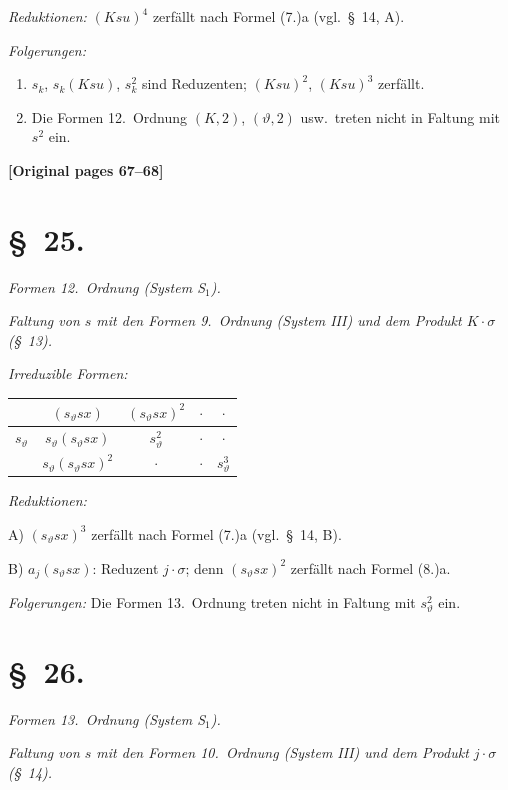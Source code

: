 \documentclass[12pt,a4paper]{article}
\begin{document}
\textit{Reduktionen:} $(Ksu)^4$ zerfällt nach Formel (7.)a (vgl.\ \S\ 14, A).

\textit{Folgerungen:}
\begin{enumerate}
\item[1)] $s_k$, $s_k(Ksu)$, $s_k^2$ sind Reduzenten; $(Ksu)^2$, $(Ksu)^3$ zerfällt.
\item[2)] Die Formen 12.\ Ordnung $(K,2)$, $(\vartheta,2)$ usw.\ treten nicht in Faltung mit $s^2$ ein.
\end{enumerate}

\noindent\textbf{[Original pages 67--68]}

\section*{\S\ 25.}

\textit{Formen 12.\ Ordnung (System S$_1$).}

\textit{Faltung von $s$ mit den Formen 9.\ Ordnung (System III) und dem Produkt $K \cdot \sigma$ (\S\ 13).}

\textit{Irreduzible Formen:}
\begin{center}
\begin{tabular}{c|cccc}
& $(s_\vartheta sx)$ & $(s_\vartheta sx)^2$ & $\cdot$ & $\cdot$ \\
\hline
$s_\vartheta$ & $s_\vartheta (s_\vartheta sx)$ & $s_\vartheta^2$ & $\cdot$ & $\cdot$ \\
& $s_\vartheta (s_\vartheta sx)^2$ & $\cdot$ & $\cdot$ & $s_\vartheta^3$
\end{tabular}
\end{center}

\textit{Reduktionen:}

A) $(s_\vartheta sx)^3$ zerfällt nach Formel (7.)a (vgl.\ \S\ 14, B).

B) $a_j(s_\vartheta sx)$: Reduzent $j \cdot \sigma$; denn $(s_\vartheta sx)^2$ zerfällt nach Formel (8.)a.

\textit{Folgerungen:} Die Formen 13.\ Ordnung treten nicht in Faltung mit $s_\vartheta^2$ ein.

\section*{\S\ 26.}

\textit{Formen 13.\ Ordnung (System S$_1$).}

\textit{Faltung von $s$ mit den Formen 10.\ Ordnung (System III) und dem Produkt $j \cdot \sigma$ (\S\ 14).}
\end{document}
